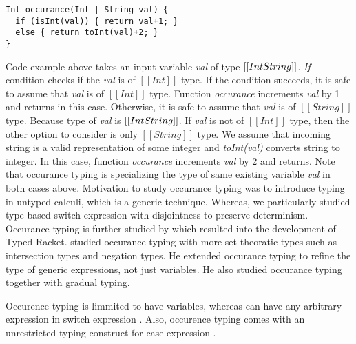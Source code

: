 \begin{lstlisting}
Int occurance(Int | String val) {
  if (isInt(val)) { return val+1; }
  else { return toInt(val)+2; }
}
\end{lstlisting}

\noindent Code example above takes an input variable \emph{val}
of type $[[Int \/ String]]$. 
\emph{If} condition checks if the \emph{val} is of $[[Int]]$ type.
If the condition succeeds, it is safe to assume that \emph{val} is of $[[Int]]$ type.
Function \emph{occurance} increments \emph{val} by 1 and returns in this case.
Otherwise, it is safe to assume that \emph{val} is of $[[String]]$ type.
Because type of \emph{val} is $[[Int \/ String]]$. If \emph{val} is not
of $[[Int]]$ type, then the other option to consider is only $[[String]]$ type.
We assume that incoming string is a valid representation of some integer
and \emph{toInt(val)} converts string to integer.
In this case, function \emph{occurance} increments \emph{val} by 2 and returns.
Note that occurance typing is specializing the type of
same existing variable \emph{val} in both cases above.
Motivation to study occurance typing was to introduce typing in untyped calculi,
which is a generic technique.
Whereas, we particularly studied type-based switch expression
with disjointness to preserve determinism.
Occurance typing is further studied by \cite{tobin2010logical}
which resulted into the development of Typed Racket.
\cite{castagna2019revisiting} studied occurance typing with more 
set-theoratic types such as intersection types and negation types.
He extended occurance typing to refine the type of
generic expressions, not just variables. He also studied occurance typing
together with gradual typing.


Occurence typing is limmited to have variables, whereas \cal
can have any arbitrary expression in switch expression
.
Also, occurence typing comes with an
unrestricted typing construct for case expression
.

